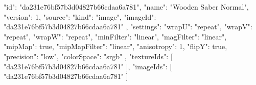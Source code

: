 {
  "id": "da231e76bf57b3d04827b66cdaa6a781",
  "name": "Wooden Saber Normal",
  "version": 1,
  "source": {
    "kind": "image",
    "imageId": "da231e76bf57b3d04827b66cdaa6a781"
  },
  "settings": {
    "wrapU": "repeat",
    "wrapV": "repeat",
    "wrapW": "repeat",
    "minFilter": "linear",
    "magFilter": "linear",
    "mipMap": true,
    "mipMapFilter": "linear",
    "anisotropy": 1,
    "flipY": true,
    "precision": "low",
    "colorSpace": "srgb"
  },
  "textureIds": [
    "da231e76bf57b3d04827b66cdaa6a781"
  ],
  "imageIds": [
    "da231e76bf57b3d04827b66cdaa6a781"
  ]
}
